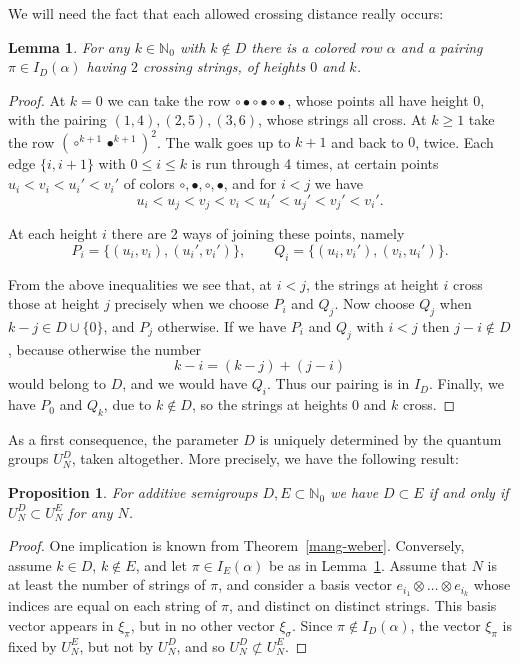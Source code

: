 \documentclass[11pt,a4paper]{article}
\newtheorem{prop}[thm]{Proposition}
\newtheorem{lem}[thm]{Lemma}
\begin{document}
We will need the fact that each allowed crossing distance really occurs:

\begin{lem}\label{crossing-exists}
For any $k\in\mathbb N_0$ with $k\notin D$ there is a colored row $\alpha$ and a pairing $\pi\in I_D(\alpha)$ having $2$ crossing strings, of heights $0$ and $k$.
\end{lem}

\begin{proof}
At $k=0$ we can take the row $\circ\bullet\circ\bullet\circ\bullet$, whose points all have height $0$, with the pairing $(1,4),(2,5),(3,6)$, whose strings all cross. At $k\geq1$ take the row $(\circ^{k+1}\bullet^{k+1})^2$. The walk goes up to $k+1$ and back to $0$, twice. Each edge $\{i,i+1\}$ with $0\leq i\leq k$ is run through 4 times, at certain points $u_i<v_i<u_i'<v_i'$ of colors $\circ,\bullet,\circ,\bullet$, and for $i<j$ we have
\[
 u_i<u_j<v_j<v_i<u_i'<u_j'<v_j'<v_i'.
\]

At each height $i$ there are 2 ways of joining these points, namely
\[
 P_i=\{(u_i,v_i),(u_i',v_i')\},\qquad Q_i=\{(u_i,v_i'),(v_i,u_i')\}.
\]

From the above inequalities we see that, at $i<j$, the strings at height $i$ cross those at height $j$ precisely when we choose $P_i$ and $Q_j$. Now choose $Q_j$ when $k-j\in D\cup\{0\}$, and $P_j$ otherwise. If we have $P_i$ and $Q_j$ with $i<j$ then $j-i\notin D$, because otherwise the number
\[
 k-i=(k-j)+(j-i)
\]
would belong to $D$, and we would have $Q_i$. Thus our pairing is in $I_D$. Finally, we have $P_0$ and $Q_k$, due to $k\notin D$, so the strings at heights $0$ and $k$ cross.
\end{proof}

As a first consequence, the parameter $D$ is uniquely determined by the quantum groups $U_N^D$, taken altogether. More precisely, we have the following result:

\begin{prop}\label{order-unitary}
For additive semigroups $D,E\subset\mathbb N_0$ we have $D\subset E$ if and only if $U_N^D\subset U_N^E$ for any $N$.
\end{prop}

\begin{proof}
One implication is known from Theorem~\ref{mang-weber}. Conversely, assume $k\in D$, $k\notin E$, and let $\pi\in I_E(\alpha)$ be as in Lemma~\ref{crossing-exists}. Assume that $N$ is at least the number of strings of $\pi$, and consider a basis vector $e_{i_1}\otimes\ldots\otimes e_{i_k}$ whose indices are equal on each string of $\pi$, and distinct on distinct strings. This basis vector appears in $\xi_\pi$, but in no other vector $\xi_\sigma$. Since $\pi\notin I_D(\alpha)$, the vector $\xi_\pi$ is fixed by $U_N^E$, but not by $U_N^D$, and so $U_N^D\not\subset U_N^E$.
\end{proof}
\end{document}
